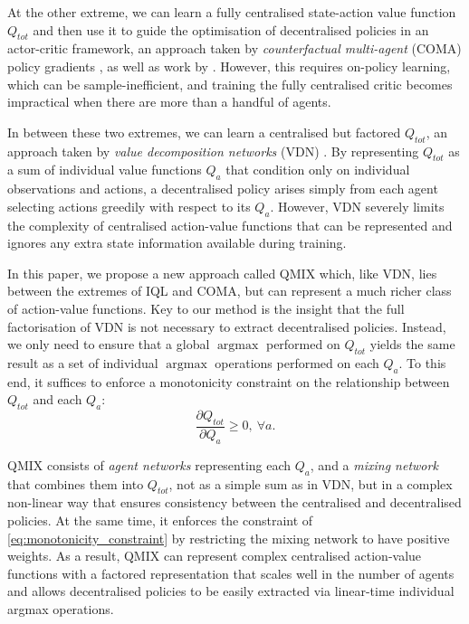 \documentclass{article}
\DeclareMathOperator*{\argmax}{argmax}
\begin{document}
At the other extreme, we can learn a fully centralised state-action value function $Q_{tot}$ and then use it to guide the optimisation of decentralised policies in an actor-critic framework, an approach taken by \emph{counterfactual multi-agent} (COMA) policy gradients \cite{foerster_counterfactual_2017}, as well as work by \citet{gupta_cooperative_2017}. However, this requires on-policy learning, which can be sample-inefficient, and training the fully centralised critic becomes impractical when there are more than a handful of agents.

In between these two extremes, we can learn a centralised but factored $Q_{tot}$, an approach taken by \emph{value decomposition networks} (VDN) \cite{sunehag_value-decomposition_2017}. By representing $Q_{tot}$ as a sum of individual value functions $Q_a$ that condition only on individual observations and actions, a decentralised policy arises simply from each agent selecting actions greedily with respect to its $Q_a$. However, VDN severely limits the complexity of centralised action-value functions that can be represented and ignores any extra state information available during training.

In this paper, we propose a new approach called QMIX which, like VDN, lies between the extremes of IQL and COMA, but can represent a much richer class of action-value functions. Key to our method is the insight that the full factorisation of VDN is not necessary to extract decentralised policies.  Instead, we only need to ensure that a global $\argmax$ performed on $Q_{tot}$ yields the same result as a set of individual $\argmax$ operations performed on each $Q_a$.  To this end, it suffices to enforce a monotonicity constraint on the relationship between $Q_{tot}$ and each $Q_a$:
\begin{equation}
\label{eq:monotonicity_constraint}
\frac{\partial Q_{tot}}{\partial Q_a}  \geq 0,~ \forall a.
\end{equation}

QMIX consists of \textit{agent networks} representing each $Q_a$, and a \emph{mixing network} that combines them into $Q_{tot}$, not as a simple sum as in VDN, but in a complex non-linear way that ensures consistency between the centralised and decentralised policies. At the same time, it enforces the constraint of \eqref{eq:monotonicity_constraint} by restricting the mixing network to have positive weights.  
As a result, QMIX can represent complex centralised action-value functions with a factored representation that scales well in the number of agents and allows decentralised policies to be easily extracted via linear-time individual argmax operations.
\end{document}
